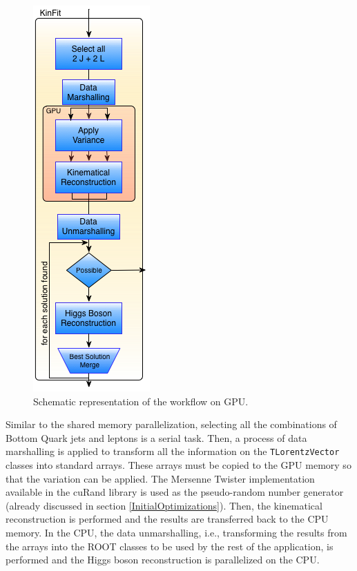 \begin{figure}[!htp]
	\begin{center}
		\includegraphics[scale=0.5]{../../common/img/gpu_pipeline.png}
		\caption{Schematic representation of the \ttDilepKinFit workflow on GPU.}
		\label{fig:GPUPipeline}
	\end{center}
\end{figure}

Similar to the shared memory parallelization, selecting all the combinations of Bottom Quark jets and leptons is a serial task. Then, a process of data marshalling is applied to transform all the information on the \texttt{TLorentzVector} classes into standard arrays. These arrays must be copied to the GPU memory so that the variation can be applied. The Mersenne Twister implementation available in the \nvidia cuRand library is used as the pseudo-random number generator (already discussed in section \ref{InitialOptimizations}). Then, the kinematical reconstruction is performed and the results are transferred back to the CPU memory. In the CPU, the data unmarshalling, i.e., transforming the results from the arrays into the ROOT classes to be used by the rest of the application, is performed and the Higgs boson reconstruction is parallelized on the CPU.

